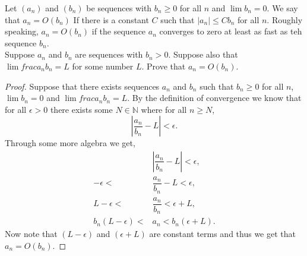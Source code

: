 \documentclass[12pt]{article}
\makeatletter
\theoremstyle{homework}
\newenvironment{exercise}[1]
{\def\@currentlabel{#1}\exercisecore}
{\endexercisecore}
\newcommand{\Nats}{\ensuremath{\mathbb N}}
\makeatother
\begin{document}
\begin{exercise}{9} Let $(a_n)$ and $(b_n)$ be sequences with $b_n \geq 0$
  for all $n$ and $\lim b_n = 0$. We say that 
  $a_n = O(b_n)$ If there is a constant $C$ such that $|a_n|\le Cb_n$ for all $n$. Roughly
  speaking, $a_n = O(b_n)$ if the sequence $a_n$ converges to zero at least as fast as teh sequence $b_n$.\\
  Suppose $a_n$ and $b_n$ are sequences with $b_n > 0$. Suppose also that $\lim frac{a_n}{b_n} = L$ for some number $L$.
  Prove that $a_n = O(b_n)$. \\

  \begin{proof}
    Suppose that there exists sequences $a_n$ and $b_n$ such that $b_n \geq 0 $ for all $n$, $\lim b_n = 0$ and $\lim frac{a_n}{b_n} = L$. By the definition of
    convergence we know that for all $\epsilon > 0$ there exists some $N \in \Nats$ where for all $n \geq N$,
    \begin{equation*}
      |\dfrac{a_n}{b_n} - L| < \epsilon.
    \end{equation*}
    Through some more algebra we get,
    \begin{align*}
      &|\dfrac{a_n}{b_n} - L| < \epsilon,\\
      -\epsilon < &\dfrac{a_n}{b_n} - L < \epsilon,\\
      L - \epsilon < &\dfrac{a_n}{b_n} < \epsilon + L,\\
      b_n (L - \epsilon) < & a_n < b_n (\epsilon + L).
    \end{align*}
    Now note that $(L - \epsilon)$ and $(\epsilon + L)$ are constant terms and thus we get that $a_n = O(b_n)$.
  \end{proof}

\end{exercise}
\vspace*{.5in}
\end{document}
